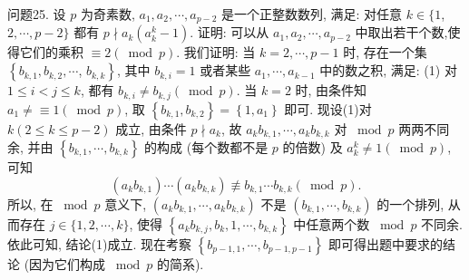 问题25. 设 $p$ 为奇素数, $a_1, a_2, \cdots, a_{p-2}$ 是一个正整数数列, 满足: 对任意 $k \in\{1$, $2, \cdots, p-2\}$ 都有 $p \nmid a_k\left(a_k^k-1\right)$. 证明: 可以从 $a_1, a_2, \cdots, a_{p-2}$ 中取出若干个数,使得它们的乘积 $\equiv 2(\bmod p)$.
我们证明: 当 $k=2, \cdots, p-1$ 时, 存在一个集 $\left\{b_{k, 1}, b_{k, 2}, \cdots\right.$, $\left.b_{k, k}\right\}$, 其中 $b_{k, i}=1$ 或者某些 $a_1, \cdots, a_{k-1}$ 中的数之积, 满足: (1) 对 $1 \leqslant i<j \leqslant k$, 都有 $b_{k, i} \not=b_{k, j}(\bmod p)$.
当 $k=2$ 时, 由条件知 $a_1 \neq \equiv 1(\bmod p)$, 取 $\left\{b_{k, 1}, b_{k, 2}\right\}=\left\{1, a_1\right\}$ 即可.
现设(1)对 $k(2 \leqslant k \leqslant p-2)$ 成立, 由条件 $p \nmid a_k$, 故 $a_k b_{k, 1}, \cdots, a_k b_{k, k}$ 对 $\bmod p$ 两两不同余, 并由 $\left\{b_{k, 1}, \cdots, b_{k, k}\right\}$ 的构成 (每个数都不是 $p$ 的倍数) 及 $a_k^k \neq 1 (\bmod p)$, 可知
$$
\left(a_k b_{k, 1}\right) \cdots\left(a_k b_{k, k}\right) \not \equiv b_{k, 1} \cdots b_{k, k}(\bmod p) .
$$
所以, 在 $\bmod p$ 意义下, $\left(a_k b_{k, 1}, \cdots, a_k b_{k, k}\right)$ 不是 $\left(b_{k, 1}, \cdots, b_{k, k}\right)$ 的一个排列, 从而存在 $j \in\{1,2, \cdots, k\}$, 使得 $\left\{a_k b_{k, j}, b_k, 1, \cdots, b_{k, k}\right\}$ 中任意两个数 $\bmod p$ 不同余.
依此可知, 结论(1)成立.
现在考察 $\left\{b_{p-1,1}, \cdots, b_{p-1, p-1}\right\}$ 即可得出题中要求的结论 (因为它们构成 $\bmod p$ 的简系).



